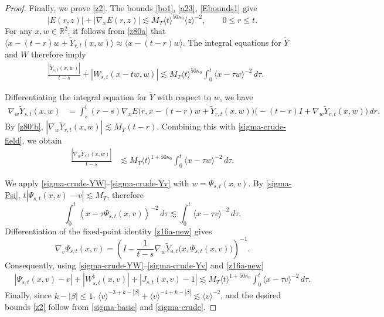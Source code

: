 \documentclass[reqno,11pt]{amsart}
\numberwithin{equation}{section}
\def\R{{\mathbb R}}
\def\R{{\bf R}}
\def\R{\mathbb{R}}
\begin{document}
\begin{proof}
	Finally, we prove \eqref{z2}. The bounds \eqref{bo1},
	\eqref{a23}, \eqref{Ebounds1} give
	\begin{equation}\label{sigma-crude-field}
	|E(r,z)|+|\nabla_xE(r,z)|
	\lesssim
	M_T\langle t\rangle^{50\kappa_0}\langle z\rangle^{-2},
	\qquad 0\leq r\leq t.
	\end{equation}
	For any $x,w\in\R^2$, it follows from \eqref{z80a} that $\big\langle x-(t-r)w+\widetilde Y_{r,t}(x,w)
	\big\rangle\approx\langle x-(t-r)w\rangle$. The integral equations for $\widetilde Y$ and $W$ therefore imply
	\begin{align}
	&\frac{|\widetilde Y_{s,t}(x,w)|}{t-s}+|W_{s,t}(x-tw,w)|\lesssim
	M_T\langle t\rangle^{50\kappa_0}
	\int_0^t\langle x-\tau w\rangle^{-2}\,d\tau.
	\label{sigma-crude-YW}
	\end{align}

	Differentiating the integral equation for $\widetilde Y$ with respect to $w$, we have
	\begin{align*}
	\nabla_w\widetilde Y_{s,t}(x,w)&=\int_s^t(r-s)\nabla_xE\bigl(r,x-(t-r)w+\widetilde Y_{r,t}(x,w)
	\bigr)\bigl(-(t-r)I+\nabla_w\widetilde Y_{r,t}(x,w)\bigr)\,dr.
	\end{align*}
	By \eqref{z80'b}, $|\nabla_w\widetilde Y_{r,t}(x,w)|\lesssim M_T(t-r)$. 
	Combining this with \eqref{sigma-crude-field}, we obtain
	\begin{align}
	\frac{|\nabla_w\widetilde Y_{s,t}(x,w)|}{t-s}&\lesssim M_T\langle t\rangle^{1+50\kappa_0}
	\int_0^t\langle x-\tau w\rangle^{-2}\,d\tau.
	\label{sigma-crude-Yv}
	\end{align}

	We apply \eqref{sigma-crude-YW}--\eqref{sigma-crude-Yv} with
	$w=\Psi_{s,t}(x,v)$. By \eqref{sigma-Psi}, $t|\Psi_{s,t}(x,v)-v|\lesssim M_T$, therefore
	\[
	\int_0^t
	\left\langle
	x-\tau\Psi_{s,t}(x,v)
	\right\rangle^{-2}\,d\tau
	\lesssim
	\int_0^t\langle x-\tau v\rangle^{-2}\,d\tau.
	\]
	Differentiation of the fixed-point identity \eqref{z16a-new} gives
	\[
	\nabla_v\Psi_{s,t}(x,v)
	=
	\left(
	I-\frac{1}{t-s}
	\nabla_w\widetilde Y_{s,t}
	\bigl(x,\Psi_{s,t}(x,v)\bigr)
	\right)^{-1}.
	\]
	Consequently, using \eqref{sigma-crude-YW}--\eqref{sigma-crude-Yv} and \eqref{z16a-new}
	\begin{align}
	&|\Psi_{s,t}(x,v)-v|+|W^\sharp_{s,t}(x,v)|+|J_{s,t}(x,v)-1|\lesssim
	M_T\langle t\rangle^{1+50\kappa_0}
	\int_0^t\langle x-\tau v\rangle^{-2}\,d\tau.
	\label{sigma-crude}
	\end{align}
	Finally, since $k-|\beta|\leq1$, $\langle v\rangle^{-3+k-|\beta|}+\langle v\rangle^{-4+k-|\beta|}\lesssim
	\langle v\rangle^{-2}$, and the desired bounds \eqref{z2} follow from \eqref{sigma-basic} and \eqref{sigma-crude}.
\end{proof}
\end{document}
